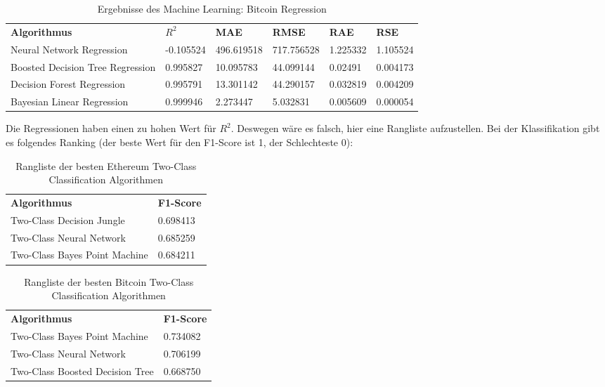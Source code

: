 \begin{table}[H]
\centering
\footnotesize
\begin{tabular}{|p{4cm}|p{}|p{}|p{}|p{}|p{}|}
\hline
\textbf{Algorithmus} & \textbf{$ R^2 $} & \textbf{MAE} & \textbf{RMSE} & \textbf{RAE} & \textbf{RSE}\\ 
\hhline{======}
Neural Network Regression & -0.105524 & 496.619518 & 717.756528 & 1.225332 & 1.105524 \\ \hline
Boosted Decision Tree Regression & 0.995827 & 10.095783 & 44.099144 & 0.02491 & 0.004173 \\ \hline
Decision Forest Regression & 0.995791 & 13.301142 & 44.290157 & 0.032819 & 0.004209 \\ \hline
Bayesian Linear Regression & 0.999946 & 2.273447 & 5.032831 & 0.005609 & 0.000054 \\ \hline
\end{tabular}
\caption{Ergebnisse des Machine Learning: Bitcoin Regression}
\end{table}

Die Regressionen haben einen zu hohen Wert für $ R^2 $. Deswegen wäre es falsch, hier eine Rangliste aufzustellen. Bei der Klassifikation gibt es folgendes Ranking (der beste Wert für den F1-Score ist 1, der Schlechteste 0):
\begin{table}[H]
\centering
\footnotesize
\begin{tabular}{|p{4cm}|p{4cm}|}
\hline
\textbf{Algorithmus} & \textbf{F1-Score}\\ 
\hhline{==}
Two-Class Decision Jungle & 0.698413 \\ \hline
Two-Class Neural Network & 0.685259 \\ \hline
Two-Class Bayes Point Machine & 0.684211 \\ \hline
\end{tabular}
\caption{Rangliste der besten Ethereum Two-Class Classification Algorithmen}
\end{table}

\begin{table}[H]
\centering
\footnotesize
\begin{tabular}{|p{4cm}|p{4cm}|}
\hline
\textbf{Algorithmus} & \textbf{F1-Score}\\ 
\hhline{==}
Two-Class Bayes Point Machine & 0.734082 \\ \hline
Two-Class Neural Network & 0.706199 \\ \hline
Two-Class Boosted Decision Tree & 0.668750 \\ \hline
\end{tabular}
\caption{Rangliste der besten Bitcoin Two-Class Classification Algorithmen}
\end{table}

